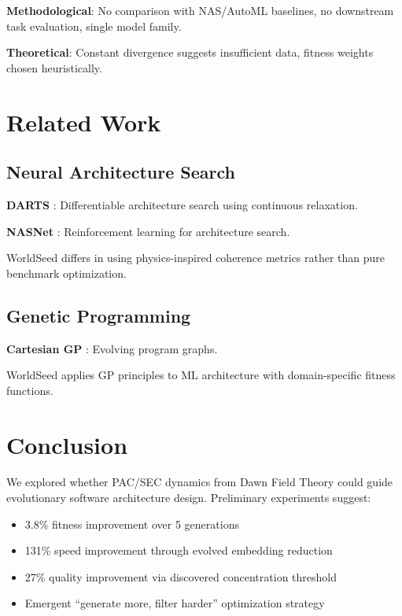 \documentclass[11pt,a4paper]{article}
\begin{document}
\textbf{Methodological}: No comparison with NAS/AutoML baselines, no downstream task evaluation, single model family.

\textbf{Theoretical}: Constant divergence suggests insufficient data, fitness weights chosen heuristically.

\section{Related Work}

\subsection{Neural Architecture Search}

\textbf{DARTS} \citep{liu2019darts}: Differentiable architecture search using continuous relaxation.

\textbf{NASNet} \citep{zoph2018learning}: Reinforcement learning for architecture search.

WorldSeed differs in using physics-inspired coherence metrics rather than pure benchmark optimization.

\subsection{Genetic Programming}

\textbf{Cartesian GP} \citep{miller2011cartesian}: Evolving program graphs.

WorldSeed applies GP principles to ML architecture with domain-specific fitness functions.

\section{Conclusion}

We explored whether PAC/SEC dynamics from Dawn Field Theory could guide evolutionary software architecture design. Preliminary experiments suggest:

\begin{itemize}
    \item 3.8\% fitness improvement over 5 generations
    \item 131\% speed improvement through evolved embedding reduction
    \item 27\% quality improvement via discovered concentration threshold
    \item Emergent ``generate more, filter harder'' optimization strategy
\end{itemize}
\end{document}
